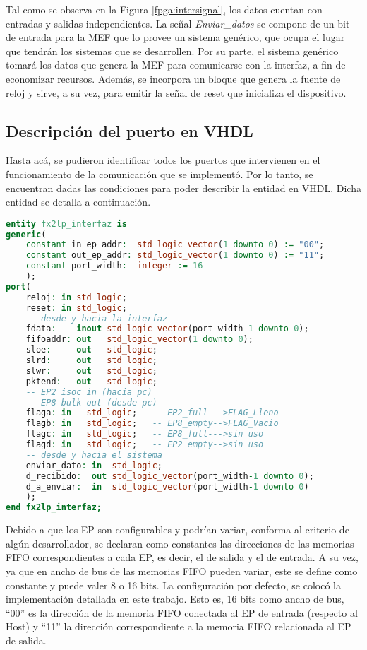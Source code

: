 	Tal como se observa en la Figura \ref{fpga:intersignal}, los datos cuentan con entradas y salidas independientes. La señal {\it Enviar\_datos} se compone de un bit de entrada para la MEF que lo provee un sistema genérico, que ocupa el lugar que tendrán los sistemas que se desarrollen. Por su parte, el sistema genérico tomará los datos que genera la MEF para comunicarse con la interfaz, a fin de economizar recursos. Además, se incorpora un bloque que genera la fuente de reloj y sirve, a su vez, para emitir la señal de reset que inicializa el dispositivo.
	
\subsection{Descripción del puerto en VHDL}
	Hasta acá, se pudieron identificar todos los puertos que intervienen en el funcionamiento de la comunicación que se implementó. Por lo tanto, se encuentran dadas las condiciones para poder describir la entidad en VHDL. Dicha entidad se detalla a continuación.
	
	\begin{lstlisting}[language=VHDL,backgroundcolor=\color{gray!30}]
entity fx2lp_interfaz is
generic(
	constant in_ep_addr:  std_logic_vector(1 downto 0) := "00";
	constant out_ep_addr: std_logic_vector(1 downto 0) := "11";
	constant port_width:  integer := 16
	);
port(
	reloj: in std_logic;
	reset: in std_logic;
	-- desde y hacia la interfaz
	fdata:    inout std_logic_vector(port_width-1 downto 0);
	fifoaddr: out	std_logic_vector(1 downto 0);
	sloe: 	  out	std_logic;
	slrd:     out	std_logic;
	slwr:     out	std_logic;
	pktend:   out	std_logic;
	-- EP2 isoc in (hacia pc)
	-- EP8 bulk out (desde pc)
	flaga: in	std_logic;   -- EP2_full--->FLAG_Lleno
	flagb: in	std_logic;   -- EP8_empty-->FLAG_Vacio
	flagc: in	std_logic;   -- EP8_full--->sin uso
	flagd: in	std_logic;   -- EP2_empty-->sin uso
	-- desde y hacia el sistema
	enviar_dato: in  std_logic;
	d_recibido:  out std_logic_vector(port_width-1 downto 0);
	d_a_enviar:  in  std_logic_vector(port_width-1 downto 0)
	);
end fx2lp_interfaz;
	\end{lstlisting}
	
	Debido a que los EP son configurables y podrían variar, conforma al criterio de algún desarrollador, se declaran como constantes las direcciones de las memorias FIFO correspondientes a cada EP, es decir, el de salida y el de entrada.
	A su vez, ya que en ancho de bus de las memorias FIFO pueden variar, este se define como constante y puede valer 8 o 16 bits. La configuración por defecto, se colocó la implementación detallada en este trabajo. Esto es, 16 bits como ancho de bus, ``00'' es la dirección de la memoria FIFO conectada al EP de entrada (respecto al Host) y ``11'' la dirección correspondiente a la memoria FIFO relacionada al EP de salida.

